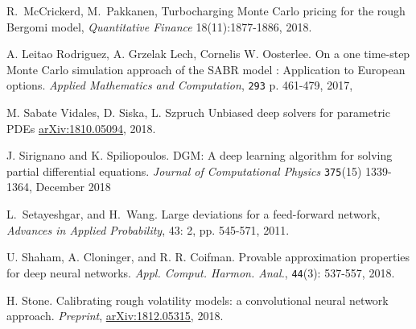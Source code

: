 \documentclass{article}
\theoremstyle{remark}
\begin{document}
\begin{thebibliography}{99}
 R.~McCrickerd, M.~Pakkanen, Turbocharging Monte Carlo pricing for the rough Bergomi model, \textit{Quantitative Finance} 18(11):1877-1886, 2018.

A. Leitao Rodriguez, A. Grzelak Lech, Cornelis W. Oosterlee.
On a one time-step Monte Carlo simulation approach of the SABR model : Application to European options.
\textit{Applied Mathematics and Computation}, {\tt 293} p. 461-479, 2017,

 M. Sabate Vidales, D. Siska, L. Szpruch
Unbiased deep solvers for parametric PDEs
\href{https://arxiv.org/abs/1810.05094}{arXiv:1810.05094}, 2018.


J. Sirignano and K. Spiliopoulos.
DGM: A deep learning algorithm for solving partial differential equations.
\textit{Journal of Computational Physics}
{\tt 375}(15) 1339-1364, December 2018

 L.~Setayeshgar, and H.~Wang. Large deviations for a feed-forward network, \textit{Advances in Applied Probability}, 43: 2, pp. 545-571, 2011.

U. Shaham, A. Cloninger, and R. R. Coifman. 
Provable approximation properties for deep neural networks. 
\textit{Appl. Comput. Harmon. Anal.}, {\tt 44}(3): 537-557, 2018.

H. Stone. Calibrating rough volatility models: a convolutional neural network approach. \textit{Preprint}, \href{https://arxiv.org/pdf/1812.05315.pdf}{arXiv:1812.05315}, 2018.
\end{thebibliography}
\end{document}
